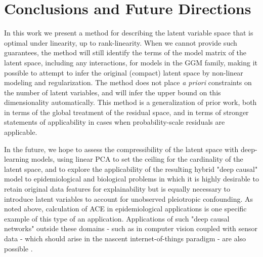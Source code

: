 \documentclass{article}
\begin{document}
\section{Conclusions and Future Directions}
In this work we present a method for describing the latent variable space that is optimal under linearity, up to rank-linearity.  When we cannot provide such guarantees, the method will still identify the terms of the model matrix of the latent space, including any interactions, for models in the GGM family, making it possible to attempt to infer the original (compact) latent space by non-linear modeling and regularization.  The method does not place \textit{a priori} constraints on the number of latent variables, and will infer the upper bound on this dimensionality automatically.  This method is a generalization of prior work, both in terms of the global treatment of the residual space, and in terms of stronger statements of applicability in cases when probability-scale residuals are applicable.

In the future, we hope to assess the compressibility of the latent
space with deep-learning models, using linear PCA to set the ceiling
for the cardinality of the latent space, and to explore the
applicability of the resulting hybrid "deep causal" model to
epidemiological and biological problems in which it is highly
desirable to retain original data features for explainability but is
equally necessary to introduce latent variables to account for
unobserved pleiotropic confounding.  As noted above, calculation of
ACE in epidemiological applications is one specific example of this
type of an application.  Applications of such "deep causal networks"
outside these domains - such as in computer vision coupled with sensor
data - which should arise in the nascent internet-of-things paradigm -
are also possible \cite{louizos_causal_2017}.

\clearpage
 
\small


\end{document}
